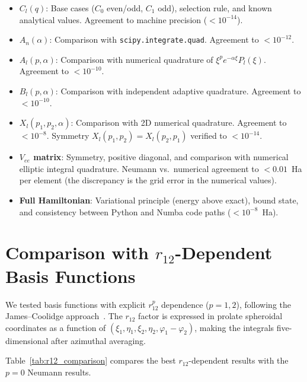 \documentclass[aps,pra,twocolumn,superscriptaddress,longbibliography]{revtex4-2}
\begin{document}
\begin{itemize}
  \item \textbf{$C_l(q)$}: Base cases ($C_0$ even/odd, $C_1$ odd),
    selection rule, and known analytical values.  Agreement to
    machine precision ($< 10^{-14}$).
  \item \textbf{$A_n(\alpha)$}: Comparison with \texttt{scipy.integrate.quad}.
    Agreement to $< 10^{-12}$.
  \item \textbf{$A_l(p, \alpha)$}: Comparison with numerical
    quadrature of $\xi^p e^{-\alpha\xi} P_l(\xi)$.
    Agreement to $< 10^{-10}$.
  \item \textbf{$B_l(p, \alpha)$}: Comparison with independent
    adaptive quadrature.  Agreement to $< 10^{-10}$.
  \item \textbf{$X_l(p_1, p_2, \alpha)$}: Comparison with 2D
    numerical quadrature.  Agreement to $< 10^{-8}$.
    Symmetry $X_l(p_1, p_2) = X_l(p_2, p_1)$ verified to
    $< 10^{-14}$.
  \item \textbf{$V_{ee}$ matrix}: Symmetry, positive diagonal,
    and comparison with numerical elliptic integral quadrature.
    Neumann vs.\ numerical agreement to $< 0.01$~Ha per element
    (the discrepancy is the grid error in the numerical values).
  \item \textbf{Full Hamiltonian}: Variational principle (energy
    above exact), bound state, and consistency between
    Python and Numba code paths ($< 10^{-8}$~Ha).
\end{itemize}

\section{Comparison with \texorpdfstring{$r_{12}$}{r12}-Dependent
Basis Functions}
\label{app:r12}

We tested basis functions with explicit $r_{12}^p$ dependence
($p = 1, 2$), following the James--Coolidge
approach~\cite{James1933}.  The $r_{12}$ factor is expressed in
prolate spheroidal coordinates as a function of $(\xi_1, \eta_1,
\xi_2, \eta_2, \varphi_1 - \varphi_2)$, making the integrals
five-dimensional after azimuthal averaging.

Table~\ref{tab:r12_comparison} compares the best $r_{12}$-dependent
results with the $p = 0$ Neumann results.
\end{document}
